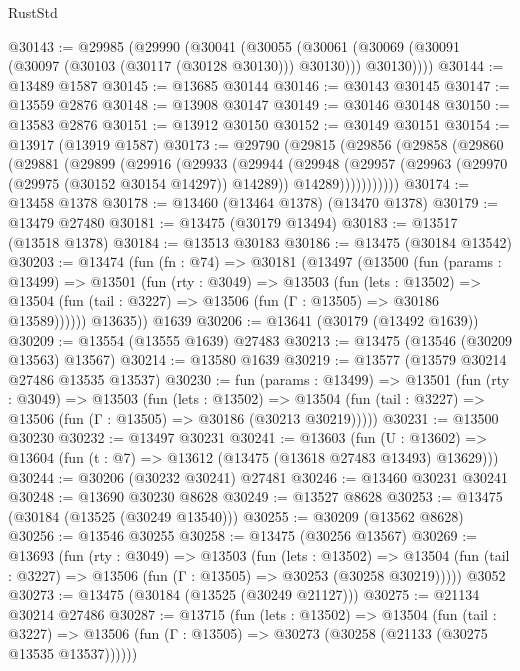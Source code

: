 \begin{lexlean}{RustStd}
\begin{coremodule}
@30143 := @29985
    (@29990
      (@30041
        (@30055
          (@30061 (@30069 (@30091 (@30097 (@30103 (@30117 (@30128 @30130))) @30130))) @30130))))
@30144 := @13489 @1587
@30145 := @13685 @30144
@30146 := @30143 @30145
@30147 := @13559 @2876
@30148 := @13908 @30147
@30149 := @30146 @30148
@30150 := @13583 @2876
@30151 := @13912 @30150
@30152 := @30149 @30151
@30154 := @13917 (@13919 @1587)
@30173 := @29790
    (@29815
      (@29856
        (@29858
          (@29860
            (@29881
              (@29899
                (@29916
                  (@29933
                    (@29944
                      (@29948
                        (@29957
                          (@29963 (@29970 (@29975 (@30152 @30154 @14297)) @14289))
                          @14289)))))))))))
@30174 := @13458 @1378
@30178 := @13460 (@13464 @1378) (@13470 @1378)
@30179 := @13479 @27480
@30181 := @13475 (@30179 @13494)
@30183 := @13517 (@13518 @1378)
@30184 := @13513 @30183
@30186 := @13475 (@30184 @13542)
@30203 := @13474
    (fun (fn : @74) =>
    @30181
      (@13497
        (@13500
          (fun (params : @13499) =>
          @13501
            (fun (rty : @3049) =>
            @13503
              (fun (lets : @13502) =>
              @13504 (fun (tail : @3227) => @13506 (fun (Γ : @13505) => @30186 @13589))))))
        @13635))
    @1639
@30206 := @13641 (@30179 (@13492 @1639))
@30209 := @13554 (@13555 @1639) @27483
@30213 := @13475 (@13546 (@30209 @13563) @13567)
@30214 := @13580 @1639
@30219 := @13577 (@13579 @30214 @27486 @13535 @13537)
@30230 := fun (params : @13499) =>
  @13501
    (fun (rty : @3049) =>
    @13503
      (fun (lets : @13502) =>
      @13504 (fun (tail : @3227) => @13506 (fun (Γ : @13505) => @30186 (@30213 @30219)))))
@30231 := @13500 @30230
@30232 := @13497 @30231
@30241 := @13603
    (fun (U : @13602) => @13604 (fun (t : @7) => @13612 (@13475 (@13618 @27483 @13493) @13629)))
@30244 := @30206 (@30232 @30241) @27481
@30246 := @13460 @30231 @30241
@30248 := @13690 @30230 @8628
@30249 := @13527 @8628
@30253 := @13475 (@30184 (@13525 (@30249 @13540)))
@30255 := @30209 (@13562 @8628)
@30256 := @13546 @30255
@30258 := @13475 (@30256 @13567)
@30269 := @13693
    (fun (rty : @3049) =>
    @13503
      (fun (lets : @13502) =>
      @13504 (fun (tail : @3227) => @13506 (fun (Γ : @13505) => @30253 (@30258 @30219)))))
    @3052
@30273 := @13475 (@30184 (@13525 (@30249 @21127)))
@30275 := @21134 @30214 @27486
@30287 := @13715
    (fun (lets : @13502) =>
    @13504
      (fun (tail : @3227) =>
      @13506 (fun (Γ : @13505) => @30273 (@30258 (@21133 (@30275 @13535 @13537))))))

\end{coremodule}
\end{lexlean}
